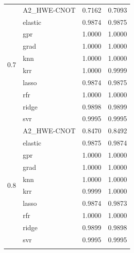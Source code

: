 \documentclass[journal=jacsat,manuscript=article]{achemso}
\begin{document}
\begin{longtable}{llrr}
	\cline{1-4}
	\multirow[t]{10}{*}{0.7} & A2{\_}HWE-CNOT & 0.7162 & 0.7093 \\
	& elastic & 0.9874 & 0.9875 \\
	& gpr & 1.0000 & 1.0000 \\
	& grad & 1.0000 & 1.0000 \\
	& knn & 1.0000 & 1.0000 \\
	& krr & 1.0000 & 0.9999 \\
	& lasso & 0.9874 & 0.9875 \\
	& rfr & 1.0000 & 1.0000 \\
	& ridge & 0.9898 & 0.9899 \\
	& svr & 0.9995 & 0.9995 \\
	\cline{1-4}
	\multirow[t]{10}{*}{0.8} & A2{\_}HWE-CNOT & 0.8470 & 0.8492 \\
	& elastic & 0.9875 & 0.9874 \\
	& gpr & 1.0000 & 1.0000 \\
	& grad & 1.0000 & 1.0000 \\
	& knn & 1.0000 & 1.0000 \\
	& krr & 0.9999 & 1.0000 \\
	& lasso & 0.9874 & 0.9873 \\
	& rfr & 1.0000 & 1.0000 \\
	& ridge & 0.9899 & 0.9898 \\
	& svr & 0.9995 & 0.9995 \\
	\cline{1-4}
	\bottomrule
	\label{table:DDCC_LC}
\end{longtable}

%
%
\end{document}
